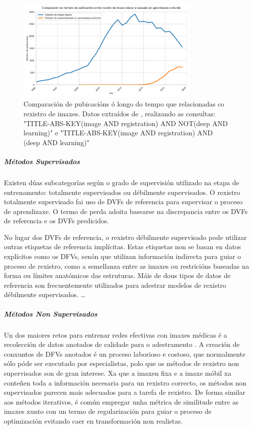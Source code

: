 \begin{figure}[hp!]
    \centering
    \includegraphics[width=0.8\textwidth]{imaxes/methods_comp.png}
    \caption{Comparación de pubicacións ó longo do tempo que relacionadas co rexistro de imaxes. Datos extraídos de \cite{scopus}, realizando as consultas: "TITLE-ABS-KEY(image AND registration) AND NOT(deep AND learning)" e "TITLE-ABS-KEY(image AND registration) AND (deep AND learning)"}
    \label{fig:method_comp}
\end{figure}

\subparagraph{Métodos Supervisados}
\label{subparagraph:Métodos Supervisados}

Existen dúas subcategorías según o grado de supervisión utilizado na etapa de entrenamento: totalmente supervisados ou débilmente supervisados.
O rexistro totalmente supervisado fai uso de DVFs de referencia para supervisar o proceso de aprendizaxe.
 O termo de perda adoita basearse na discrepancia entre os DVFs de referencia e os DVFs predicidos.
 
No lugar dos DVFs de referencia, o rexistro débilmente supervisado pode utilizar outras etiquetas de referencia implícitas.
 Estas etiquetas non se basan en datos explícitos como os DFVs, senón que utilizan información indirecta para guiar o proceso de rexistro, como a semellanza entre as imaxes ou restricións baseadas na forma ou límites anatómicos das estruturas.
 Máis de dous tipos de datos de referencia son frecuentemente utilizados para adestrar modelos de rexistro débilmente supervisados. \cite{bharati2022deeplearningmedicalimage}
\dots

\subparagraph{Métodos Non Supervisados}
\label{subparagraph:Métodos Non Supervisados}

Un dos maiores retos para entrenar redes efectivas con imaxes médicas é a recolección de datos anotados de calidade para o adestramento \cite{medicalimageanalysis}.
A creación de conxuntos de DFVs anotados é un proceso laborioso e costoso, que normalmente sólo póde ser executado por especialistas, polo que os métodos de rexistro non supervisados son de gran interese.
Xa que a imaxen fixa e a imaxe móbil xa conteñen toda a información necesaria para un rexistro correcto, os métodos non supervisados parecen mais adecuados para a tarefa de rexistro.
De forma similar aos métodos iterativos, é común empregar unha métrica de similitude entre as imaxes xunto con un termo de regularización para guiar o proceso de optimización evitando caer en transformación non realistas.

